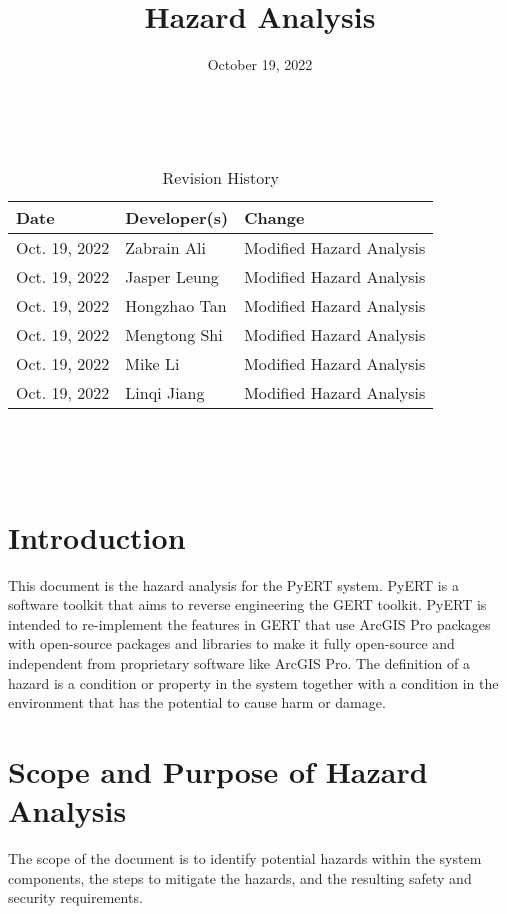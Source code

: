 \documentclass{article}
\title{Hazard Analysis\\\progname}
\author{\authname}
\date{October 19, 2022}
\begin{document}
\maketitle
\thispagestyle{empty}

~\newpage


\begin{table}[hp]
\caption{Revision History} \label{TblRevisionHistory}
\begin{tabularx}{\textwidth}{llX}
\toprule
\textbf{Date} & \textbf{Developer(s)} & \textbf{Change}\\
\midrule
Oct. 19, 2022 & Zabrain Ali & Modified Hazard Analysis\\
Oct. 19, 2022 & Jasper Leung & Modified Hazard Analysis\\
Oct. 19, 2022 & Hongzhao Tan & Modified Hazard Analysis\\
Oct. 19, 2022 & Mengtong Shi & Modified Hazard Analysis\\
Oct. 19, 2022 & Mike Li & Modified Hazard Analysis\\
Oct. 19, 2022 & Linqi Jiang & Modified Hazard Analysis\\
\bottomrule
\end{tabularx}
\end{table}

~\newpage

\tableofcontents

~\newpage
\thispagestyle{empty}
\listoftables
\newpage



\section{Introduction}

This document is the hazard analysis for the PyERT system. PyERT is a software toolkit that aims to reverse engineering the GERT toolkit. PyERT is intended to re-implement the features in GERT that use ArcGIS Pro packages with open-source packages and libraries to make it fully open-source and independent from proprietary software like ArcGIS Pro. The definition of a hazard is a condition or property in the system together with a condition in the environment that has the potential to cause harm or damage.

\section{Scope and Purpose of Hazard Analysis}
The scope of the document is to identify potential hazards within the system components, the steps to mitigate the hazards, and the resulting safety and security requirements. 
\end{document}
